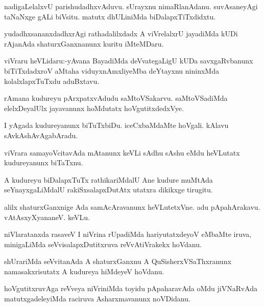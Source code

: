 \documentclass{article}
\begin{document}
\begin{mn}%
nadigaLelalxvU parishudadhxvAduvu. sUrayxnu nimaRlanAdanu. suvAsaneyAgi taNaNxge gALi 
biVsitu. matutx dhULiniMda biDalapxTiTxdidxtu.
\end{mn}

\begin{mn}%
yudadhxsananxdadhxrAgi rathadalilxdadx A viVrelalxrU jayadiMda kUDi rAjanAda 
shaturxGanxnanunx kuritu iMteMDaru.
\end{mn}

\begin{mn}%
viVraru heVLidaru:-yAvana BayadiMda deVvategaLigU kUDa savxgaRvbanunx biTiTxdadxroV aMtaha 
viduyxnAmxliyeMba deYtayxnu nininxMda kolalxlapxTuTxdu aduBxtavu.
\end{mn}

\begin{mn}%
rAmana kudureyu pArxpatxvAdudu saMtoVSakarvu. saMtoVSadiMda elelxDeyalUlx jayavanunx 
hoMdutatx hoVgutitxdedxVye.
\end{mn}

\begin{mn}%
I yAgada kudureyanunx biTuTxbiDu. iceCxbaMdaMte hoVgali. kAlavu sAvkAshAvAgabAradu.
\end{mn}

\begin{mn}%
viVrara samayoVcitavAda mAtanunx keVLi sAdhu sAshu eMdu heVLutatx kudureyanunx biTaTxnu.
\end{mn}

\begin{mn}%
A kudureyu biDalapxTuTx rathikariMdalU Ane kudure muMtAda seYnayxgaLiMdalU rakiSxsalapxDutAtx
utatxra dikikxge tirugitu.
\end{mn}

\begin{mn}%
alilx shaturxGanxnige Ada samAcAravanunx heVLutetxVne. adu pApahArakavu. vAtAsxyXyananeV. 
keVLu.
\end{mn}

\begin{mn}%
niVlaratanxda rasaveV I niVrina rUpadiMda hariyutatxdeyoV eMbaMte iruva, minigaLiMda 
seVvisalapxDutitxruva reVvAtiVrakekx hoVdanu.
\end{mn}

\begin{mn}%
shUrariMda seVvitanAda A shaturxGanxnu A QuSisherxVSaThxranunx namasakxrisutatx A kudureya 
hiMdeyeV hoVdanu.
\end{mn}

\begin{mn}%
hoVgutitxruvAga reVveya niVriniMda toyidu pApaharavAda oMdu jiVNaRvAda matutxgadeleyiMda 
raciruva Asharxmavanunx noVDidanu.
\end{mn}
\end{document}
